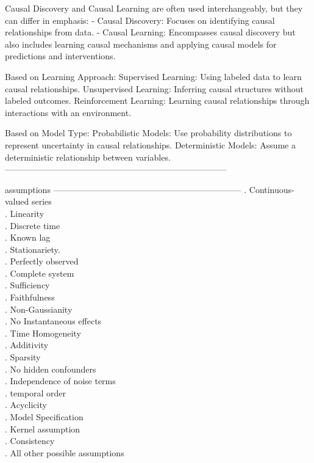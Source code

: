 Causal Discovery and Causal Learning are often used interchangeably, but they can differ in emphasis:
- Causal Discovery: Focuses on identifying causal relationships from data.
- Causal Learning: Encompasses causal discovery but also includes learning causal mechanisms and applying causal models for predictions and interventions.

Based on Learning Approach:
Supervised Learning: Using labeled data to learn causal relationships.
Unsupervised Learning: Inferring causal structures without labeled outcomes.
Reinforcement Learning: Learning causal relationships through interactions with an environment.

Based on Model Type:
Probabilistic Models: Use probability distributions to represent uncertainty in causal relationships.
Deterministic Models: Assume a deterministic relationship between variables.
------------------------------------------------------------------------------

assumptions ------------------------------------------------------------------
. Continuous-valued series\\  %
    . Linearity        \\         %
    . Discrete time  \\           %
    . Known lag      \\           %
    . Stationariety.  \\           %
    . Perfectly observed   \\     %
    . Complete system\\
    . Sufficiency\\
    . Faithfulness\\
    . Non-Gaussianity\\
    . No Instantaneous effects\\
    . Time Homogeneity\\
    . Additivity\\
    . Sparsity\\
    . No hidden confounders\\
    . Independence of noise terms\\
    . temporal order\\
    . Acyclicity\\
    . Model Specification\\
    . Kernel assumption\\
    . Consistency\\
    . All other possible assumptions\\

